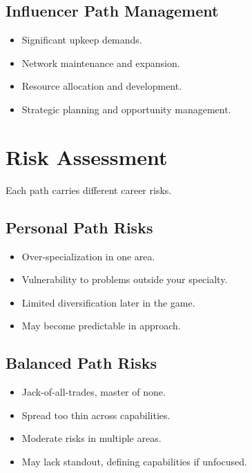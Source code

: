 \subsection*{Influencer Path Management}
\begin{itemize}
\item Significant upkeep demands.
\item Network maintenance and expansion.
\item Resource allocation and development.
\item Strategic planning and opportunity management.
\end{itemize}


\section{Risk Assessment}
\label{sec:xp-risk}

Each path carries different career risks.

\subsection*{Personal Path Risks}
\begin{itemize}
\item Over-specialization in one area.
\item Vulnerability to problems outside your specialty.
\item Limited diversification later in the game.
\item May become predictable in approach.
\end{itemize}

\subsection*{Balanced Path Risks}
\begin{itemize}
\item Jack-of-all-trades, master of none.
\item Spread too thin across capabilities.
\item Moderate risks in multiple areas.
\item May lack standout, defining capabilities if unfocused.
\end{itemize}

